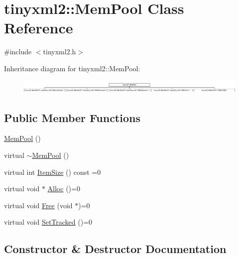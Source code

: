 \hypertarget{classtinyxml2_1_1_mem_pool}{}\section{tinyxml2\+:\+:Mem\+Pool Class Reference}
\label{classtinyxml2_1_1_mem_pool}


{\ttfamily \#include $<$tinyxml2.\+h$>$}

Inheritance diagram for tinyxml2\+:\+:Mem\+Pool\+:\begin{figure}[H]
\begin{center}
\leavevmode
\includegraphics[height=0.691358cm]{classtinyxml2_1_1_mem_pool}
\end{center}
\end{figure}
\subsection*{Public Member Functions}
\begin{DoxyCompactItemize}
\item 
\mbox{\hyperlink{classtinyxml2_1_1_mem_pool_a9101a0083d7370c85bd5aaaba7157f84}{Mem\+Pool}} ()
\item 
virtual \mbox{\hyperlink{classtinyxml2_1_1_mem_pool_ae55ad9e3faeca702e6ccbb38fdbcad72}{$\sim$\+Mem\+Pool}} ()
\item 
virtual int \mbox{\hyperlink{classtinyxml2_1_1_mem_pool_a0c518d49e3a94bde566f61e13b7240bb}{Item\+Size}} () const =0
\item 
virtual void $\ast$ \mbox{\hyperlink{classtinyxml2_1_1_mem_pool_a4f977b5fed752c0bbfe5295f469d6449}{Alloc}} ()=0
\item 
virtual void \mbox{\hyperlink{classtinyxml2_1_1_mem_pool_a49e3bfac2cba2ebd6776b31e571f64f7}{Free}} (void $\ast$)=0
\item 
virtual void \mbox{\hyperlink{classtinyxml2_1_1_mem_pool_ac5804dd1387b2e4de5eef710076a0db1}{Set\+Tracked}} ()=0
\end{DoxyCompactItemize}


\subsection{Constructor \& Destructor Documentation}
\mbox{\label{classtinyxml2_1_1_mem_pool_a9101a0083d7370c85bd5aaaba7157f84}} 
